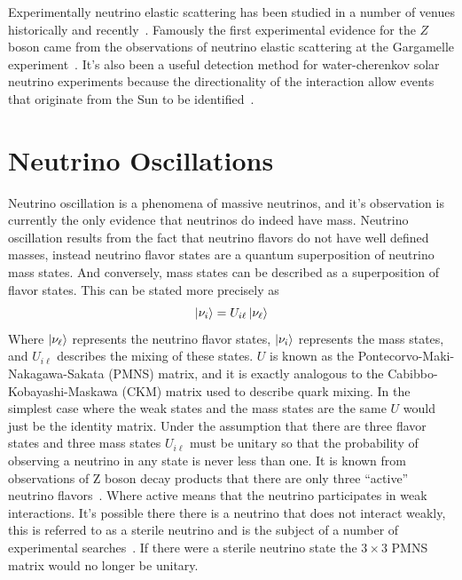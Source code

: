 Experimentally neutrino elastic scattering has been studied in a number
of venues historically and recently~\cite{reines2, es_measurement, nutev}.
Famously the first experimental evidence for the $Z$ boson came from
the observations of neutrino elastic scattering at the
Gargamelle experiment~\cite{gargamelle}.
It's also been a useful detection method for water-cherenkov solar
neutrino experiments because the directionality of the interaction
allow events that originate from the Sun to be identified~\cite{sno_first,
kamiokande, superk_first_solar}.

\section{Neutrino Oscillations}
\label{sec:neut_osc}
Neutrino oscillation is a phenomena of massive neutrinos, and it's observation
is currently the only evidence that neutrinos do indeed have mass.
Neutrino oscillation results from the fact that neutrino flavors do not have
well defined masses, instead neutrino flavor states are a quantum superposition
of neutrino mass states.
And conversely, mass states can be described as a superposition of flavor states.
This can be stated more precisely as
\begin{equation}
    \ket{\nu_{i}} = U_{i\ell}\ket{\nu_\ell}
\end{equation}
Where $\ket{\nu_\ell}$ represents the neutrino flavor states, $\ket{\nu_i}$
represents the mass states, and $U_{i\ell}$ describes the mixing of these
states.
$U$ is known as the Pontecorvo-Maki-Nakagawa-Sakata (PMNS) matrix,
and it is exactly analogous to the Cabibbo-Kobayashi-Maskawa (CKM) matrix used
to describe quark mixing.
In the simplest case where the weak states and the mass states are the same
$U$ would just be the identity matrix.
Under the assumption that there are three flavor states and three mass states
$U_{i\ell}$ must be unitary so that the probability of observing
a neutrino in any state is never less than one.
It is known from observations of Z boson decay products that
there are only three ``active'' neutrino flavors~\cite{Zdecay}.
Where active means that the neutrino participates in
weak interactions.
It's possible there there is a neutrino that does not interact
weakly, this is referred to as a sterile neutrino and is the
subject of a number of experimental searches~\cite{prospect, lsnd, miniboone, jsns2}.
If there were a sterile neutrino state the $3\times3$ PMNS matrix would
no longer be unitary.

